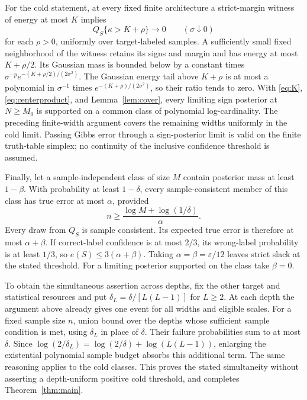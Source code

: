 \documentclass[11pt]{article}
\theoremstyle{remark}\newtheorem{remark}[theorem]{Remark}
\begin{document}
For the cold statement, at every fixed finite architecture a strict-margin
witness of energy at most $K$ implies
\begin{equation}\label{eq:cold}
 Q_S\{\kappa>K+\rho\}\longrightarrow0\qquad(\sigma\downarrow0)
\end{equation}
for each $\rho>0$, uniformly over target-labeled samples. A sufficiently
small fixed neighborhood of the witness retains its signs and margin
and has energy at most $K+\rho/2$. Its Gaussian mass is bounded below by
a constant times $\sigma^{-p}e^{-(K+\rho/2)/(2\sigma^2)}$.
The Gaussian energy tail above $K+\rho$ is at most a polynomial in
$\sigma^{-1}$ times $e^{-(K+\rho)/(2\sigma^2)}$, so their ratio tends
to zero. With \eqref{eq:K}, \eqref{eq:centerproduct}, and
Lemma~\ref{lem:cover}, every limiting sign posterior at $N\ge M_0$ is
supported on a common class of polynomial log-cardinality. The preceding
finite-width argument covers the remaining widths uniformly in the
cold limit. Passing Gibbs error through a sign-posterior limit is valid
on the finite truth-table simplex; no continuity of the inclusive
confidence threshold is assumed.

Finally, let a sample-independent class of size $M$ contain posterior
mass at least $1-\beta$. With probability at least $1-\delta$, every
sample-consistent member of this class has true error at most $\alpha$,
provided
\[
 n\ge\frac{\log M+\log(1/\delta)}{\alpha}.
\]
Every draw from $Q_S$ is sample consistent. Its expected true error is
therefore at most $\alpha+\beta$. If correct-label confidence is at most
$2/3$, its wrong-label probability is at least $1/3$, so
$e(S)\le3(\alpha+\beta)$. Taking $\alpha=\beta=\varepsilon/12$
leaves strict slack at the stated threshold. For a limiting posterior
supported on the class take $\beta=0$.

To obtain the simultaneous assertion across depths, fix the other target
and statistical resources and put $\delta_L=\delta/[L(L-1)]$ for
$L\ge2$. At each depth the argument above already gives one event for
all widths and eligible scales. For a fixed sample size $n$, union bound
over the depths whose sufficient sample condition is met, using
$\delta_L$ in place of $\delta$. Their failure probabilities sum to at
most $\delta$. Since
$\log(2/\delta_L)=\log(2/\delta)+\log(L(L-1))$, enlarging the
existential polynomial sample budget absorbs this additional term.
The same reasoning applies to the cold classes. This proves the stated
simultaneity without asserting a depth-uniform positive cold threshold,
and completes Theorem~\ref{thm:main}.
\end{document}
